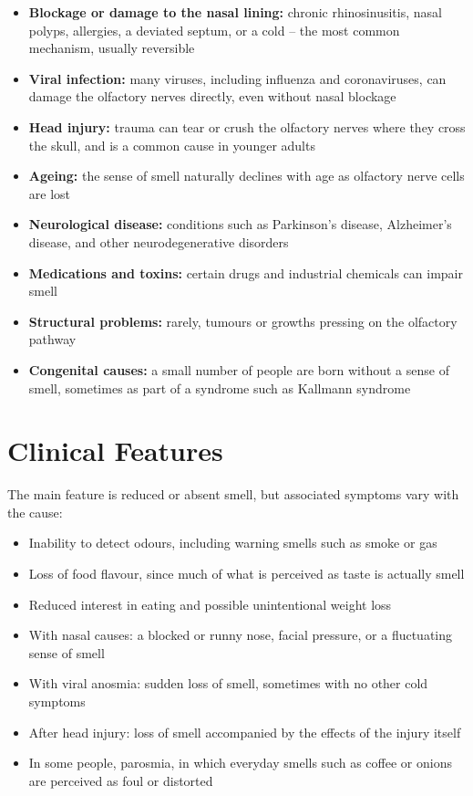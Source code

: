 \begin{itemize}
    \item \textbf{Blockage or damage to the nasal lining:} chronic rhinosinusitis, nasal polyps, allergies, a deviated septum, or a cold -- the most common mechanism, usually reversible
    \item \textbf{Viral infection:} many viruses, including influenza and coronaviruses, can damage the olfactory nerves directly, even without nasal blockage
    \item \textbf{Head injury:} trauma can tear or crush the olfactory nerves where they cross the skull, and is a common cause in younger adults
    \item \textbf{Ageing:} the sense of smell naturally declines with age as olfactory nerve cells are lost
    \item \textbf{Neurological disease:} conditions such as Parkinson's disease, Alzheimer's disease, and other neurodegenerative disorders
    \item \textbf{Medications and toxins:} certain drugs and industrial chemicals can impair smell
    \item \textbf{Structural problems:} rarely, tumours or growths pressing on the olfactory pathway
    \item \textbf{Congenital causes:} a small number of people are born without a sense of smell, sometimes as part of a syndrome such as Kallmann syndrome
\end{itemize}

\section*{Clinical Features}
The main feature is reduced or absent smell, but associated symptoms vary with the cause:

\begin{itemize}
    \item Inability to detect odours, including warning smells such as smoke or gas
    \item Loss of food flavour, since much of what is perceived as taste is actually smell
    \item Reduced interest in eating and possible unintentional weight loss
    \item With nasal causes: a blocked or runny nose, facial pressure, or a fluctuating sense of smell
    \item With viral anosmia: sudden loss of smell, sometimes with no other cold symptoms
    \item After head injury: loss of smell accompanied by the effects of the injury itself
    \item In some people, parosmia, in which everyday smells such as coffee or onions are perceived as foul or distorted
\end{itemize}

